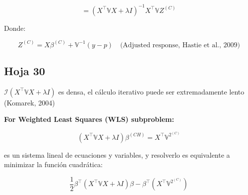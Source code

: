 \documentclass[12pt]{article}
\begin{document}
\[
= \left( X^\top \mathbb{V} X + \lambda I \right)^{-1} X^\top \mathbb{V} Z^{(C)}
\]

Donde:

\[
Z^{(C)} = X \beta^{(C)} + \mathbb{V}^{-1} (y - p)
\quad \text{(Adjusted response, Hastie et al., 2009)}
\]
\subsection{Hoja 30}
$\mathcal{I}\left( X^\top \mathbb{V} X + \lambda I \right)$ es densa, el cálculo iterativo puede ser extremadamente lento (Komarek, 2004)

\medskip

\textbf{For Weighted Least Squares (WLS) subproblem:}

\[
\left( X^\top \mathbb{V} X + \lambda I \right) \beta^{(CH)} = X^\top \mathbb{V}^{2^{(C)}}
\]

es un sistema lineal de ecuaciones y variables, y resolverlo es equivalente a minimizar la función cuadrática:

\[
\frac{1}{2} \beta^\top \left( X^\top \mathbb{V} X + \lambda I \right) \beta - \beta^\top \left( X^\top \mathbb{V}^{2^{(C)}} \right)
\]
\end{document}
